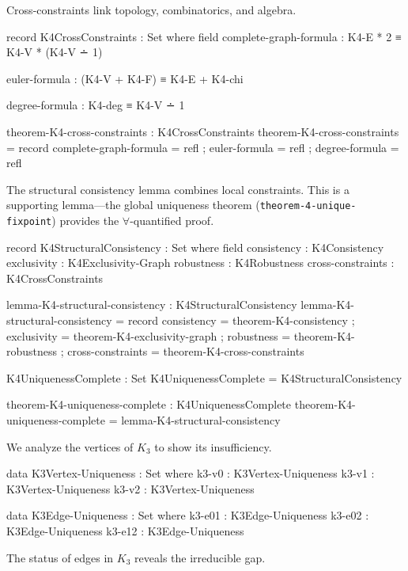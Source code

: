 \documentclass[11pt,a4paper]{book}
\begin{document}
Cross-constraints link topology, combinatorics, and algebra.

\begin{code}
record K4CrossConstraints : Set where
  field
    complete-graph-formula : K4-E * 2 ≡ K4-V * (K4-V ∸ 1)
    
    euler-formula          : (K4-V + K4-F) ≡ K4-E + K4-chi
    
    degree-formula         : K4-deg ≡ K4-V ∸ 1

theorem-K4-cross-constraints : K4CrossConstraints
theorem-K4-cross-constraints = record
  { complete-graph-formula = refl
  ; euler-formula          = refl
  ; degree-formula         = refl
  }
\end{code}

The structural consistency lemma combines local constraints. This is a supporting lemma---the global uniqueness theorem (\texttt{theorem-4-unique-fixpoint}) provides the $\forall$-quantified proof.

\begin{code}
record K4StructuralConsistency : Set where
  field
    consistency       : K4Consistency
    exclusivity       : K4Exclusivity-Graph
    robustness        : K4Robustness
    cross-constraints : K4CrossConstraints

lemma-K4-structural-consistency : K4StructuralConsistency
lemma-K4-structural-consistency = record
  { consistency       = theorem-K4-consistency
  ; exclusivity       = theorem-K4-exclusivity-graph
  ; robustness        = theorem-K4-robustness
  ; cross-constraints = theorem-K4-cross-constraints
  }

K4UniquenessComplete : Set
K4UniquenessComplete = K4StructuralConsistency

theorem-K4-uniqueness-complete : K4UniquenessComplete
theorem-K4-uniqueness-complete = lemma-K4-structural-consistency
\end{code}

We analyze the vertices of $K_3$ to show its insufficiency.

\begin{code}
data K3Vertex-Uniqueness : Set where
  k3-v0 : K3Vertex-Uniqueness
  k3-v1 : K3Vertex-Uniqueness
  k3-v2 : K3Vertex-Uniqueness

data K3Edge-Uniqueness : Set where
  k3-e01 : K3Edge-Uniqueness
  k3-e02 : K3Edge-Uniqueness
  k3-e12 : K3Edge-Uniqueness
\end{code}

The status of edges in $K_3$ reveals the irreducible gap.
\end{document}
